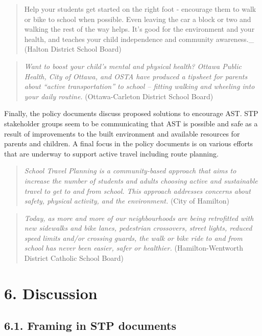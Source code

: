 \documentclass[]{elsarticle} %
\begin{document}
\begin{quote}
Help your students get started on the right foot - encourage them to
walk or bike to school when possible. Even leaving the car a block or
two and walking the rest of the way helps. It's good for the environment
and your health, and teaches your child independence and community
awareness.\_ (Halton District School Board)
\end{quote}

\begin{quote}
\emph{Want to boost your child's mental and physical health? Ottawa
Public Health, City of Ottawa, and OSTA have produced a tipsheet for
parents about ``active transportation'' to school -- fitting walking and
wheeling into your daily routine.} (Ottawa-Carleton District School
Board)
\end{quote}

Finally, the policy documents discuss proposed solutions to encourage
AST. STP stakeholder groups seem to be communicating that AST is
possible and safe as a result of improvements to the built environment
and available resources for parents and children. A final focus in the
policy documents is on various efforts that are underway to support
active travel including route planning.

\begin{quote}
\emph{School Travel Planning is a community-based approach that aims to
increase the number of students and adults choosing active and
sustainable travel to get to and from school. This approach addresses
concerns about safety, physical activity, and the environment.} (City of
Hamilton)
\end{quote}

\begin{quote}
\emph{Today, as more and more of our neighbourhoods are being
retrofitted with new sidewalks and bike lanes, pedestrian crossovers,
street lights, reduced speed limits and/or crossing guards, the walk or
bike ride to and from school has never been easier, safer or healthier.}
(Hamilton-Wentworth District Catholic School Board)
\end{quote}

\hypertarget{discussion}{%
\section{6. Discussion}\label{discussion}}

\hypertarget{framing-in-stp-documents}{%
\subsection{6.1. Framing in STP
documents}\label{framing-in-stp-documents}}
\end{document}
